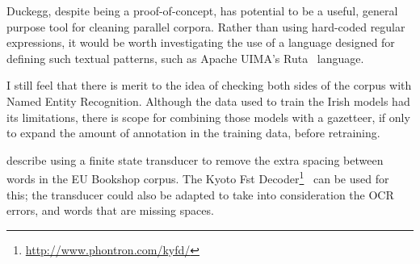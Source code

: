 Duckegg, despite being a proof-of-concept, has potential to be a useful, general purpose tool for cleaning
parallel corpora. Rather than using hard-coded regular expressions, it would be worth investigating the
use of a language designed for defining such textual patterns, such as Apache UIMA's Ruta~\citep{kluegl2016ruta} language.

I still feel that there is merit to the idea of checking both sides of the corpus with Named Entity Recognition. Although
the data used to train the Irish models had its limitations, there is scope for combining those models with a gazetteer, if
only to expand the amount of annotation in the training data, before retraining.

\citet{SkadinsEA:LREC14} describe using a finite state transducer to remove the extra spacing between words in the EU Bookshop
corpus. The Kyoto Fst Decoder\footnote{\href{http://www.phontron.com/kyfd/}{http://www.phontron.com/kyfd/}}~\citep{neubig09interspeech} 
can be used for this; the transducer could also be adapted to take
into consideration the OCR errors, and words that are missing spaces.
